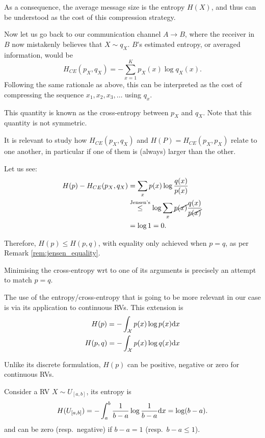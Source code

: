 As a consequence, the average message size is the entropy $H(X)$, and thus can be understood as the cost of this compression strategy.

Now let us go back to our communication channel $A\to B$, where the receiver in $B$ now mistakenly believes that $X\sim q_X$. $B$'s estimated entropy, or averaged information, would be 
\begin{equation}
	H_{CE}(p_X,q_X) = -\sum_{x=1}^K p_X(x) \log q_X(x).
\end{equation}
Following the same rationale as above, this can be interpreted as the cost of compressing the sequence $x_1,x_2,x_3,\ldots$ using $q_x$. 

This quantity is known as the cross-entropy between $p_X$ and $q_X$. Note that this quantity is not symmetric. 

It is relevant to study how $H_{CE}(p_X,q_X)$ and $H(P) = H_{CE}(p_X,p_X)$ relate to one another, in particular if one of them is (always) larger than the other. 

Let us see:
\begin{align}
	H(p) - H_{CE}(p_X,q_X) 
	&= \sum_x p(x) \log \frac{q(x)}{p(x)}\\
	&\stackrel{\text{Jensen's}}{\leq} \log \sum_x \cancel{p(x)} \frac{q(x)}{\cancel{p(x)}}\\
	&= \log 1 = 0.
\end{align}

Therefore, $H(p) \leq H(p,q)$, with equality only achieved when $p=q$, as per Remark \ref{rem:jensen_equality}.
\begin{remark}
	Minimising the cross-entropy wrt to one of its arguments is precisely an attempt to match $p=q$. 
\end{remark}

The use of the entropy/cross-entropy that is going to be more relevant in our case is via its application to continuous RVs. This extension is 
\begin{align}
	H(p) = -\int_{\mathcal X} p(x)\log p(x){\text{d}x}\\
	H(p,q) = -\int_{\mathcal X} p(x)\log q(x){\text{d}x}\\
\end{align}

\begin{remark}
	Unlike its discrete formulation, $H(p)$ can be positive, negative or zero for continuous RVs. 
\end{remark}

\begin{example}
	Consider a RV $X\sim U_{[a,b]}$, its entropy is
	$$H(U_{[a,b]}) = -\int_a^b \frac{1}{b-a}\log\frac{1}{b-a} {\text{d}x} = \log(b-a).
	$$
	and can be zero (resp.~negative) if $b-a=1$ (resp.~$b-a\le 1$).
\end{example}


